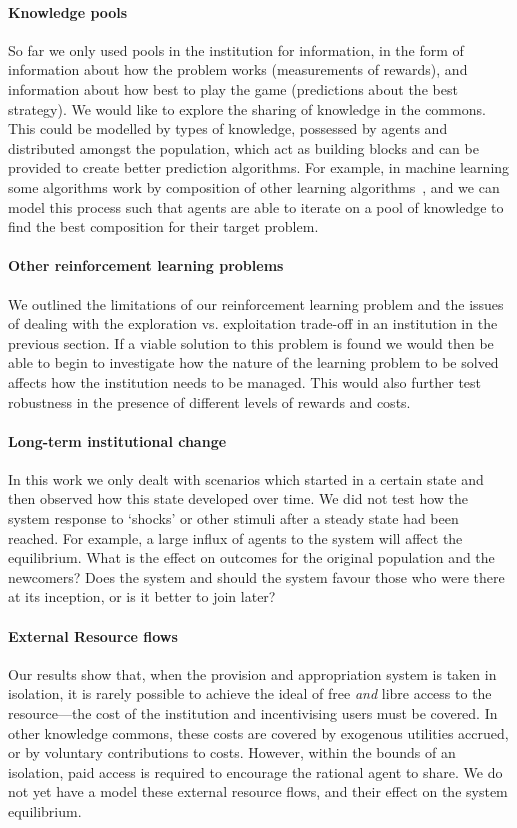 \paragraph{Knowledge pools} So far we only used pools in the institution for
information, in the form of information about how the problem works
(measurements of rewards), and information about how best to play the game
(predictions about the best strategy). We would like to explore the sharing of
knowledge in the commons. This could be modelled by types of knowledge,
possessed by agents and distributed amongst the population, which act as
building blocks and can be provided to create better prediction algorithms.
For example, in machine learning some algorithms work by composition of other
learning algorithms~\citep{Opitz1999}, and we can model this process such
that agents are able to iterate on a pool of knowledge to find the best
composition for their target problem.

\paragraph{Other reinforcement learning problems} We outlined the limitations
of our reinforcement learning problem and the issues of dealing with the
exploration vs. exploitation trade-off in an institution in the previous
section. If a viable solution to this problem is found we would then be able
to begin to investigate how the nature of the learning problem to be solved
affects how the institution needs to be managed. This would also further test
robustness in the presence of different levels of rewards and costs.

\paragraph{Long-term institutional change} In this work we only dealt with
scenarios which started in a certain state and then observed how this state
developed over time. We did not test how the system response to `shocks' or
other stimuli after a steady state had been reached. For example, a large
influx of agents to the system will affect the equilibrium. What is the effect
on outcomes for the original population and the newcomers? Does the system and
should the system favour those who were there at its inception, or is it
better to join later?

\paragraph{External Resource flows}
Our results show that, when the provision and appropriation system is taken in
isolation, it is rarely possible to achieve the ideal of free \emph{and} libre
access to the resource---the cost of the institution and incentivising users
must be covered. In other knowledge commons, these costs are covered by
exogenous utilities accrued, or by voluntary contributions to costs. However,
within the bounds of an isolation, paid access is required to encourage the
rational agent to share. We do not yet have a model these external resource
flows, and their effect on the system equilibrium.

